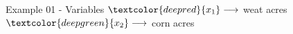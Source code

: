 \begin{frame}{Example 01 - Variables}
\Huge{
$\textcolor{deepred}  {{x}_{1}} \longrightarrow$
    weat acres \\ \vspace{1cm}
$\textcolor{deepgreen}{{x}_{2}} \longrightarrow$
    corn acres
}
\end{frame}
